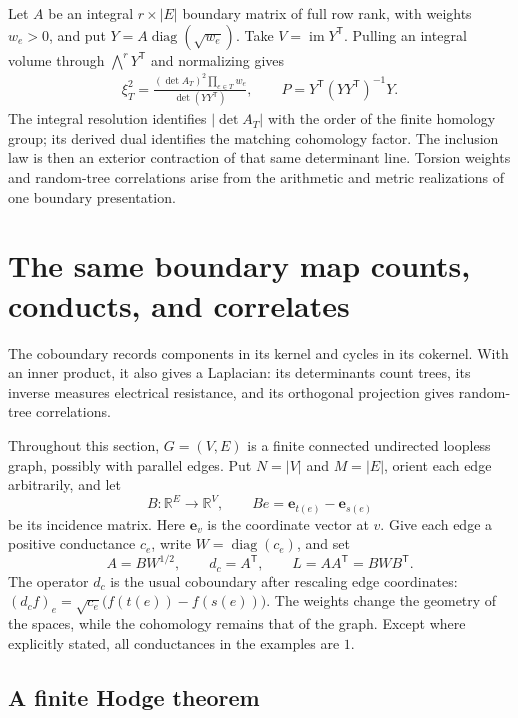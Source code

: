 \documentclass[11pt]{article}
\theoremstyle{definition}
\theoremstyle{remark}
\newcommand{\R}{\mathbb R}
\begin{document}
Let $A$ be an integral $r\times|E|$ boundary matrix of full row rank, with weights $w_e>0$, and put $Y=A\operatorname{diag}(\sqrt{w_e})$. Take $V=\operatorname{im}Y^{\mathsf T}$. Pulling an integral volume through $\bigwedge^rY^{\mathsf T}$ and normalizing gives
\begin{equation}\label{eq:derived-exterior-coordinates}
 \begin{aligned}
 \xi_T^2=
 \frac{(\det A_T)^2\prod_{e\in T}w_e}
      {\det(YY^{\mathsf T})},\qquad
 P=Y^{\mathsf T}(YY^{\mathsf T})^{-1}Y.
 \end{aligned}
\end{equation}
The integral resolution identifies $|\det A_T|$ with the order of the finite homology group; its derived dual identifies the matching cohomology factor. The inclusion law is then an exterior contraction of that same determinant line. Torsion weights and random-tree correlations arise from the arithmetic and metric realizations of one boundary presentation.


\section{The same boundary map counts, conducts, and correlates}
\label{sec:graph-linear}

The coboundary records components in its kernel and cycles in its cokernel. With an inner product, it also gives a Laplacian: its determinants count trees, its inverse measures electrical resistance, and its orthogonal projection gives random-tree correlations.

Throughout this section, $G=(V,E)$ is a finite connected undirected loopless graph, possibly with parallel edges. Put $N=|V|$ and $M=|E|$, orient each edge arbitrarily, and let
\[
 B:\R^E\longrightarrow\R^V,
 \qquad Be=\mathbf e_{t(e)}-\mathbf e_{s(e)}
\]
be its incidence matrix. Here $\mathbf e_v$ is the coordinate vector at $v$. Give each edge a positive conductance $c_e$, write $W=\operatorname{diag}(c_e)$, and set
\[
 A=BW^{1/2},\qquad d_c=A^{\mathsf T},\qquad
 L=AA^{\mathsf T}=BWB^{\mathsf T}.
\]
The operator $d_c$ is the usual coboundary after rescaling edge coordinates: $(d_cf)_e=\sqrt{c_e}\bigl(f(t(e))-f(s(e))\bigr)$. The weights change the geometry of the spaces, while the cohomology remains that of the graph. Except where explicitly stated, all conductances in the examples are $1$.

\subsection{A finite Hodge theorem}
\end{document}
